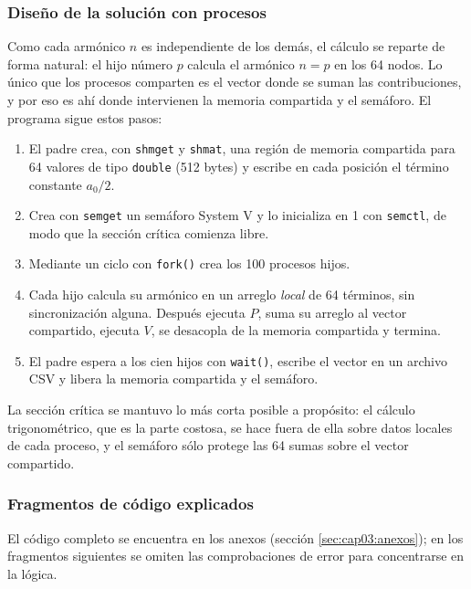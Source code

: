 \subsubsection{Diseño de la solución con procesos}
\label{sec:cap03:aaron:diseno}

Como cada armónico $n$ es independiente de los demás, el cálculo se reparte de forma natural: el hijo número $p$ calcula el armónico $n = p$ en los 64 nodos. Lo único que los procesos comparten es el vector donde se suman las contribuciones, y por eso es ahí donde intervienen la memoria compartida y el semáforo. El programa sigue estos pasos:

\begin{enumerate}
    \item El padre crea, con \texttt{shmget} y \texttt{shmat}, una región de memoria compartida para 64 valores de tipo \texttt{double} (512 bytes) y escribe en cada posición el término constante $a_0/2$.
    \item Crea con \texttt{semget} un semáforo System V y lo inicializa en 1 con \texttt{semctl}, de modo que la sección crítica comienza libre.
    \item Mediante un ciclo con \texttt{fork()} crea los 100 procesos hijos.
    \item Cada hijo calcula su armónico en un arreglo \emph{local} de 64 términos, sin sincronización alguna. Después ejecuta $P$, suma su arreglo al vector compartido, ejecuta $V$, se desacopla de la memoria compartida y termina.
    \item El padre espera a los cien hijos con \texttt{wait()}, escribe el vector en un archivo CSV y libera la memoria compartida y el semáforo.
\end{enumerate}

La sección crítica se mantuvo lo más corta posible a propósito: el cálculo trigonométrico, que es la parte costosa, se hace fuera de ella sobre datos locales de cada proceso, y el semáforo sólo protege las 64 sumas sobre el vector compartido.

\subsubsection{Fragmentos de código explicados}
\label{sec:cap03:aaron:codigo}

El código completo se encuentra en los anexos (sección \ref{sec:cap03:anexos}); en los fragmentos siguientes se omiten las comprobaciones de error para concentrarse en la lógica.

